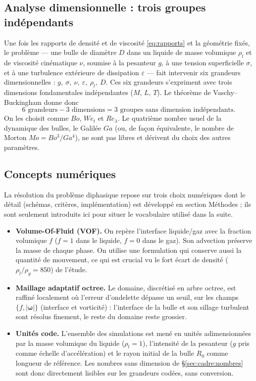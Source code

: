 \subsection{Analyse dimensionnelle : trois groupes indépendants}
\label{sec:cadre:buckingham}

Une fois les rapports de densité et de viscosité \eqref{eq:rapports} et la
géométrie fixés, le problème --- une bulle de diamètre $D$ dans un liquide de
masse volumique $\rho_l$ et de viscosité cinématique $\nu$, soumise à la
pesanteur $g$, à une tension superficielle $\sigma$, et à une turbulence
extérieure de dissipation $\varepsilon$ --- fait intervenir six grandeurs
dimensionnelles : $g,\ \sigma,\ \nu,\ \varepsilon,\ \rho_l,\ D$. Ces six
grandeurs s'expriment avec trois dimensions fondamentales indépendantes
($M$, $L$, $T$). Le théorème de Vaschy--Buckingham donne donc
\begin{equation}
    6 \text{ grandeurs} - 3 \text{ dimensions} = 3 \text{ groupes sans dimension indépendants}.
    \label{eq:buckingham}
\end{equation}
On les choisit comme $Bo$, $We_t$ et $Re_\lambda$. Le quatrième
nombre usuel de la dynamique des bulles, le Galilée $Ga$ (ou, de façon
équivalente, le nombre de Morton $Mo = Bo^3/Ga^4$), ne sont pas libres et dérivent du choix des autres paramètres.

\subsection{Concepts numériques}
\label{sec:cadre:numerique}

La résolution du problème diphasique repose sur trois choix numériques dont
le détail (schémas, critères, implémentation) est développé en section
Méthodes ; ils sont seulement introduits ici pour situer le vocabulaire
utilisé dans la suite.

\begin{itemize}
\item \textbf{Volume-Of-Fluid (VOF).} On repère l'interface liquide/gaz avec la fraction volumique $f$ ($f=1$ dans le liquide, $f=0$ dans le gaz). Son advection préserve la masse de chaque phase. On utilise une formulation qui conserve aussi la quantité de mouvement, ce qui est crucial vu le fort écart de densité ($\rho_l/\rho_g=850$) de l'étude.
    \item \textbf{Maillage adaptatif octree.} Le domaine, discrétisé en
    arbre octree, est raffiné localement où l'erreur d'ondelette dépasse un
    seuil, sur les champs $\{f, |\boldsymbol{\omega}|\}$ (interface et
    vorticité) : l'interface de la bulle et son sillage turbulent sont
    résolus finement, le reste du domaine reste grossier.
    \item \textbf{Unités code.} L'ensemble des simulations est mené en
    unités adimensionnées par la masse volumique du liquide ($\rho_l=1$),
    l'intensité de la pesanteur ($g$ pris comme échelle d'accélération) et
    le rayon initial de la bulle $R_0$ comme longueur de référence. Les
    nombres sans dimension de \S\ref{sec:cadre:nombres} sont donc directement
    lisibles sur les grandeurs codées, sans conversion.
\end{itemize}
